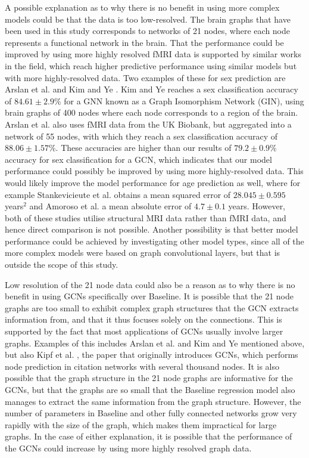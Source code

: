 A possible explanation as to why there is no benefit in using more complex models could be that the data is too low-resolved. The brain graphs that have been used in this study corresponds to networks of 21 nodes, where each node represents a functional network in the brain.  That the performance could be improved by using more highly resolved fMRI data is supported by similar works in the field, which reach higher predictive performance using similar models but with more highly-resolved data. Two examples of these for sex prediction are Arslan et al. \cite{arslan} and Kim and Ye \cite{understanding_gnn}. Kim and Ye reaches a sex classification accuracy of $84.61\pm2.9\%$ for a GNN known as a Graph Isomorphism Network (GIN), using brain graphs of 400 nodes where each node corresponds to a region of the brain. Arslan et al. also uses fMRI data from the UK Biobank, but aggregated into a network of 55 nodes, with which they reach a sex classification accuracy of $88.06\pm1.57\%$. These accuracies are higher than our results of $79.2\pm0.9\%$ accuracy for sex classification for a GCN, which indicates that our model performance could possibly be improved by using more highly-resolved data. This would likely improve the model performance for age prediction as well, where for example Stankevicieute et al. \cite{stankeviciute} obtains a mean squared error of $28.045\pm0.595$ years$^2$ and Amoroso et al. \cite{amoroso_multiplex_age} a mean absolute error of $4.7\pm0.1$ years. However, both of these studies utilise structural MRI data rather than fMRI data, and hence direct comparison is not possible. Another possibility is that better model performance could be achieved by investigating other model types, since all of the more complex models were based on graph convolutional layers, but that is outside the scope of this study. 

Low resolution of the 21 node data could also be a reason as to why there is no benefit in using GCNs specifically over Baseline. It is possible that the 21 node graphs are too small to exhibit complex graph structures that the GCN extracts information from, and that it thus focuses solely on the connections. This is supported by the fact that most applications of GCNs usually involve larger graphs. Examples of this includes Arslan et al. and Kim and Ye mentioned above, but also Kipf et al. \cite{kipf_semi_supervised}, the paper that originally introduces GCNs, which performs node prediction in citation networks with several thousand nodes. It is also possible that the graph structure in the 21 node graphs are informative for the GCNs, but that the graphs are so small that the Baseline regression model also manages to extract the same information from the graph structure. However, the number of parameters in Baseline and other fully connected networks grow very rapidly with the size of the graph, which makes them impractical for large graphs. In the case of either explanation, it is possible that the performance of the GCNs could increase by using more highly resolved graph data.


